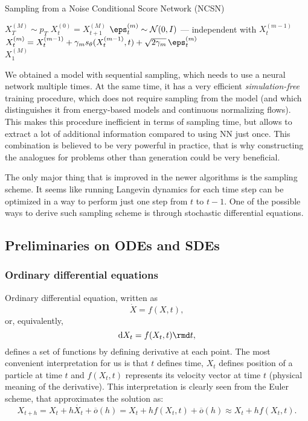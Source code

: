 \begin{algorithm}
\caption{Sampling from a Noise Conditional Score Network (NCSN)}\label{alg:sampling_ncsn}
\begin{algorithmic}

\State $X_T^{(M)} \sim p_T$
    \State $X_t^{(0)} = X_{t + 1}^{(M)}$
     
        \State $\eps_t^{(m)} \sim \mathcal{N}(0, I)$ --- independent with $X_t^{(m - 1)}$
        \State $X_t^{(m)} = X_t^{(m - 1)} + \gamma_m s_\theta(X_t^{(m - 1)}, t) + \sqrt{2 \gamma_m}\, \eps_t^{(m)}$ 
    \EndFor
\EndFor \\
\Return $X_1^{(M)}$
\end{algorithmic}
\end{algorithm}

We obtained a model with sequential sampling, which needs to use a neural network multiple times. At the same time, it has a very efficient \emph{simulation-free} training procedure, which does not require sampling from the model (and which distinguishes it from energy-based models and continuous normalizing flows). This makes this procedure inefficient in terms of sampling time, but allows to extract a lot of additional information compared to using NN just once. This combination is believed to be very powerful in practice, that is why constructing the analogues for problems other than generation could be very beneficial.

The only major thing that is improved in the newer algorithms is the sampling scheme. It seems like running Langevin dynamics for each time step can be optimized in a way to perform just one step from $t$ to $t - 1$. One of the possible ways to derive such sampling scheme is through stochastic differential equations.


\subsection{Preliminaries on ODEs and SDEs}

\subsubsection{Ordinary differential equations}

Ordinary differential equation, written as
\[
    \dot{X} = f(X, t),
\]
or, equivalently,
\begin{equation}
\label{eq:ode}
    \mathrm d X_t = f(X_t, t) \rmd t,
\end{equation}
defines a set of functions by defining derivative at each point. The most convenient interpretation for us is that $t$ defines time, $X_t$ defines position of a particle at time $t$ and $f(X_t, t)$ represents its velocity vector at time $t$ (physical meaning of the derivative). This interpretation is clearly seen from the Euler scheme, that approximates the solution as:
\begin{equation}\label{eq:ode_euler}
    X_{t + h} = X_t + h \dot{X_t} + \overline{o}(h) = X_t + h f(X_t, t) + \overline{o}(h) \approx X_t + h f(X_t, t).
\end{equation}


